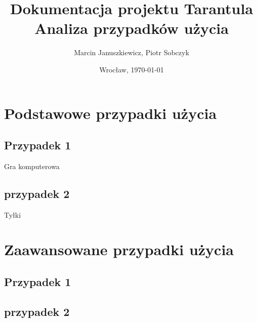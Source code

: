 \documentclass[11pt,leqno]{article}
\title{\LARGE Dokumentacja projektu \textbf{Tarantula}\\
							Analiza przypadków użycia}
\author{Marcin Januszkiewicz, Piotr Sobczyk}
\date{Wrocław, \today}
\begin{document}
\maketitle 
\newpage
\tableofcontents
\newpage
\pagestyle{headings}

\section{Podstawowe przypadki użycia}

\subsection{Przypadek 1}
Gra komputerowa
\subsection{przypadek 2}
Tyłki
\section{Zaawansowane przypadki użycia}

\subsection{Przypadek 1}

\subsection{przypadek 2}
\end{document}
